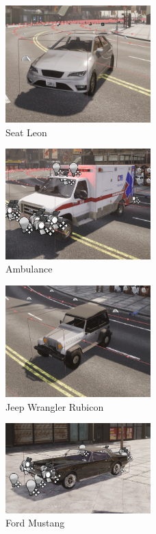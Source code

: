 \begin{figure} [h!]
    \centering
    \includegraphics[width=0.5\textwidth]{images/seat_leon.png}
    \caption[Seat Leon]{Seat Leon}
    \label{fig:seat_leon}
\end{figure}

\begin{figure} [h!]
    \centering
    \includegraphics[width=0.5\textwidth]{images/ambulance.png}
    \caption[Ambulance]{Ambulance}
    \label{fig:ambulance}
\end{figure}

\begin{figure} [h!]
    \centering
    \includegraphics[width=0.5\textwidth]{images/jeep_wrangler_rubicon.png}
    \caption[Jeep Wrangler Rubicon]{Jeep Wrangler Rubicon}
    \label{fig:jeep_wrangler}
\end{figure}

\begin{figure} [h!]
    \centering
    \includegraphics[width=0.5\textwidth]{images/ford_mustang.png}
    \caption[Ford Mustang]{Ford Mustang}
    \label{fig:ford_mustang}
\end{figure}

